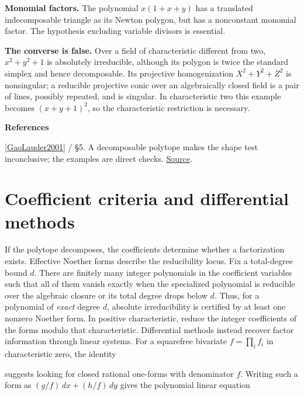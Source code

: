 \documentclass[11pt,a4paper,oneside,openany]{book}
\newcommand{\atlasdisplay}[1]{\par\begingroup\centering\vspace{3pt}\noindent\adjustbox{max width=\linewidth}{\(\displaystyle #1\)}\par\vspace{5pt}\endgroup}
\newenvironment{sources}{\par\smallskip\begingroup\footnotesize\color{atlasgray}\leftskip=10pt\setlength{\parskip}{2pt}}{\par\endgroup\smallskip}
\begin{document}
\begin{atlasblock}[boundary]
\color{black} \textbf{Monomial factors.} The polynomial \(x(1+x+y)\) has a translated indecomposable triangle as its Newton polygon, but has a nonconstant monomial factor. The hypothesis excluding variable divisors is essential.\par
\color{black} \textbf{The converse is false.} Over a field of characteristic different from two, \(x^2+y^2+1\) is absolutely irreducible, although its polygon is twice the standard simplex and hence decomposable. Its projective homogenization \(X^2+Y^2+Z^2\) is nonsingular; a reducible projective conic over an algebraically closed field is a pair of lines, possibly repeated, and is singular. In characteristic two this example becomes \((x+y+1)^2\), so the characteristic restriction is necessary.\par
\end{atlasblock}\color{black}
\begin{sources}
\textbf{References}\par\smallskip
\noindent\hyperlink{ref:GaoLauder2001}{[GaoLauder2001]} / §5. A decomposable polytope makes the shape test inconclusive; the examples are direct checks. \href{https://link.springer.com/article/10.1007/s00454-001-0024-0}{Source}.\par
\end{sources}\color{black}
\section{Coefficient criteria and differential methods}
\color{black} If the polytope decomposes, the coefficients determine whether a factorization exists. Effective Noether forms describe the reducibility locus. Fix a total-degree bound \(d\). There are finitely many integer polynomials in the coefficient variables such that all of them vanish exactly when the specialized polynomial is reducible over the algebraic closure or its total degree drops below \(d\). Thus, for a polynomial of \emph{exact} degree \(d\), absolute irreducibility is certified by at least one nonzero Noether form. In positive characteristic, reduce the integer coefficients of the forms modulo that characteristic. Differential methods instead recover factor information through linear systems. For a squarefree bivariate \(f=\prod_i f_i\) in characteristic zero, the identity\par

\atlasdisplay{\frac{df}{f}=\sum_i\frac{df_i}{f_i}}
\color{black} suggests looking for closed rational one-forms with denominator \(f\). Writing such a form as \((g/f)\,dx+(h/f)\,dy\) gives the polynomial linear equation\par
\end{document}
